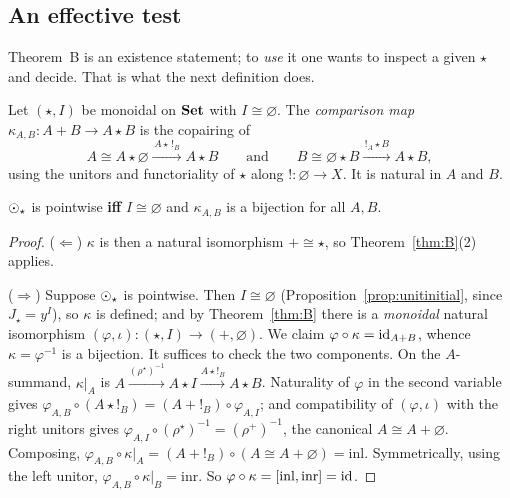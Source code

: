 \subsection{An effective test}

Theorem~B is an existence statement; to \emph{use} it one wants to inspect a
given $\star$ and decide. That is what the next definition does.

\begin{Definition}\label{def:kappa}
Let $(\star,I)$ be monoidal on $\mathbf{Set}$ with $I\cong\varnothing$. The
\emph{comparison map} $\kappa_{A,B}\colon A+B\to A\star B$ is the copairing of
\[
  A\cong A\star\varnothing\xrightarrow{\,A\star\,{!}_B\,}A\star B
  \qquad\text{and}\qquad
  B\cong\varnothing\star B\xrightarrow{\,{!}_A\star B\,}A\star B,
\]
using the unitors and functoriality of $\star$ along $!\colon\varnothing\to X$.
It is natural in $A$ and $B$.
\end{Definition}

\begin{Theorem}\label{thm:Bprime}
$\mathbin{\odot}_\star$ is pointwise \textbf{iff} $I\cong\varnothing$ and $\kappa_{A,B}$
is a bijection for all $A,B$.
\end{Theorem}

\begin{proof}
($\Leftarrow$) $\kappa$ is then a natural isomorphism $+\cong\star$, so
Theorem~\ref{thm:B}(2) applies.

($\Rightarrow$) Suppose $\mathbin{\odot}_\star$ is pointwise. Then $I\cong\varnothing$
(Proposition~\ref{prop:unitinitial}, since $J_\star=y^I$), so $\kappa$ is
defined; and by Theorem~\ref{thm:B} there is a \emph{monoidal} natural
isomorphism $(\varphi,\iota)\colon(\star,I)\to(+,\varnothing)$. We claim
$\varphi\circ\kappa=\mathrm{id}_{A+B}$, whence $\kappa=\varphi^{-1}$ is a bijection. It
suffices to check the two components. On the $A$-summand, $\kappa|_A$ is
$A\xrightarrow{(\rho^\star)^{-1}} A\star I\xrightarrow{A\star !_B} A\star B$.
Naturality of $\varphi$ in the second variable gives
$\varphi_{A,B}\circ(A\star !_B)=(A+!_B)\circ\varphi_{A,I}$; and compatibility of
$(\varphi,\iota)$ with the right unitors gives
$\varphi_{A,I}\circ(\rho^\star)^{-1}=(\rho^{+})^{-1}$, the canonical
$A\cong A+\varnothing$. Composing, $\varphi_{A,B}\circ\kappa|_A =
(A+!_B)\circ(A\cong A+\varnothing)=\mathrm{inl}$. Symmetrically, using the left
unitor, $\varphi_{A,B}\circ\kappa|_B=\mathrm{inr}$. So
$\varphi\circ\kappa=[\mathrm{inl},\mathrm{inr}]=\mathrm{id}$.
\end{proof}

